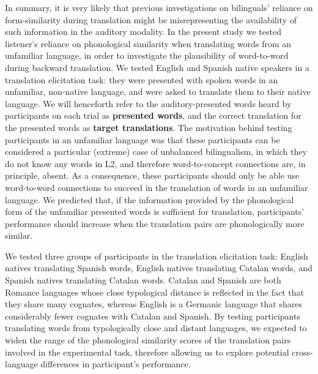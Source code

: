 \documentclass[
  english,
  man,floatsintext]{apa7}
\begin{document}
In summary, it is very likely that previous investigations on bilinguals' reliance on form-similarity during translation might be misrepresenting the availability of such information in the auditory modality. In the present study we tested listener's reliance on phonological similarity when translating words from an unfamiliar language, in order to investigate the plausibility of word-to-word during backward translation. We tested English and Spanish native speakers in a translation elicitation task: they were presented with spoken words in an unfamiliar, non-native language, and were asked to translate them to their native language. We will henceforth refer to the auditory-presented words heard by participants on each trial as \textbf{presented words}, and the correct translation for the presented words as \textbf{target translations}. The motivation behind testing participants in an unfamiliar language was that these participants can be considered a particular (extreme) case of unbalanced bilingualism, in which they do not know any words in L2, and therefore word-to-concept connections are, in principle, absent. As a consequence, these participants should only be able use word-to-word connections to succeed in the translation of words in an unfamiliar language. We predicted that, if the information provided by the phonological form of the unfamiliar presented words is sufficient for translation, participants' performance should increase when the translation pairs are phonologically more similar.

We tested three groups of participants in the translation elicitation task: English natives translating Spanish words, English natives translating Catalan words, and Spanish natives translating Catalan words. Catalan and Spanish are both Romance languages whose close typological distance is reflected in the fact that they share many cognates, whereas English is a Germanic language that shares considerably fewer cognates with Catalan and Spanish. By testing participants translating words from typologically close and distant languages, we expected to widen the range of the phonological similarity scores of the translation pairs involved in the experimental task, therefore allowing us to explore potential cross-language differences in participant's performance.
\end{document}
